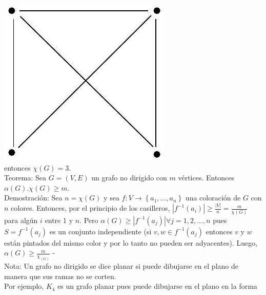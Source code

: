 \documentclass[10pt]{article}
\begin{document}
\includegraphics[max width=\textwidth, center]{2025_09_05_b69e29efaf9a6d2aa81ag-06}\\
entonces $\chi(G)=3$.\\
Teorema: Sea $G=(V, E)$ un grafo no dirigido con $m$ vértices. Entonces $\alpha(G) . \chi(G) \geq m$.\\
Demostración: Sea $n=\chi(G)$ y sea $f: V \longrightarrow\left\{a_{1}, \ldots, a_{n}\right\}$ una coloración de $G$ con $n$ colores. Entonces, por el principio de los casilleros, $\left|f^{-1}\left(a_{i}\right)\right| \geq \frac{|V|}{n}=\frac{m}{\chi(G)}$ para algún $i$ entre 1 y $n$. Pero $\alpha(G) \geq\left|f^{-1}\left(a_{j}\right)\right| \forall j=1,2, \ldots, n$ pues $S=f^{-1}\left(a_{j}\right)$ es un conjunto independiente (si $v, w \in f^{-1}\left(a_{j}\right)$ entonces $v$ y $w$ están pintados del mismo color y por lo tanto no pueden ser adyacentes). Luego, $\alpha(G) \geq \frac{m}{\chi_{(G)}}$ -\\
Nota: Un grafo no dirigido se dice planar si puede dibujarse en el plano de manera que sus ramas no se corten.\\
Por ejemplo, $K_{4}$ es un grafo planar pues puede dibujarse en el plano en la forma\\
\end{document}
